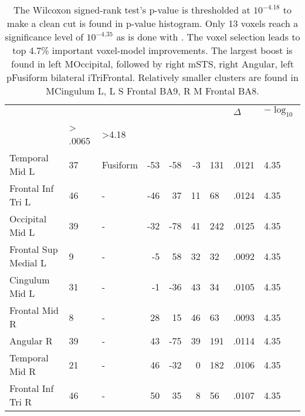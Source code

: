 \begin{table}
    \small
    \centering
    \begin{ThreePartTable}
        \begin{tabularx}{\textwidth}{l l p{1.5cm} *{3}{r} *{2}{P{1.2cm}}P{1.4cm}}
             \\
    \toprule
     &  &  &  &  &  &  & \(\Delta\)  & \(-\log_{10}\) \\
    
    \toprule
      &  > .0065 & >4.18   \\
    \midrule
    Temporal Mid L & 37 & Fusiform & -53 & -58 & -3 & 131 & .0121 & 4.35\\
    Frontal Inf Tri L & 46 & - & -46 & 37 & 11 & 68 & .0124 & 4.35 \\
    Occipital Mid L & 39 & - & -32 & -78 & 41 & 242 & .0125 & 4.35 \\
    Frontal Sup Medial L & 9 & - & -5 & 58 & 32 & 32 & .0092 & 4.35 \\
    Cingulum Mid L & 31 & - & -1 & -36 & 43 & 34 & .0105 & 4.35  \\
    Frontal Mid R & 8 & - & 28 & 15 & 46 & 63 & .0093 & 4.35  \\
    Angular R & 39 & - & 43 & -75 & 39 & 191 & .0114 & 4.35  \\
    Temporal Mid R & 21 & - & 46 & -32 & 0 & 182 & .0106 & 4.35 \\
    Frontal Inf Tri R & 46 & - & 50 & 35 & 8 & 56 & .0107  & 4.35\\
\bottomrule
    \end{tabularx}
\end{ThreePartTable}
\caption[ Voxel Improvement Clusters]{The Wilcoxon signed-rank test's p-value is thresholded at \(10^{-4.18}\) to make a clean cut is found in p-value histogram. Only 13 voxels reach a significance level of \(10^{-4.35}\) as is done with . The voxel selection leads to top 4.7\% important voxel-model improvements. The largest  boost is found in left MOccipital, followed by right mSTS, right Angular, left pFusiform bilateral iTriFrontal. Relatively smaller clusters are found in MCingulum L, L S Frontal BA9, R M Frontal BA8.  \label{tab:asnImprovementClusters}}
\end{table}
